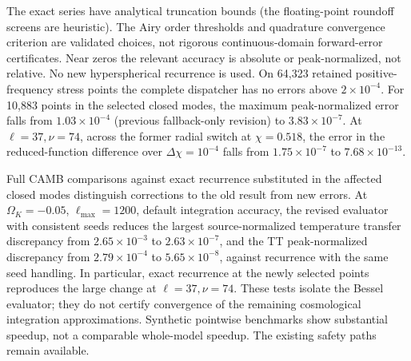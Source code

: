 \documentclass[10pt]{article}
\begin{document}
The exact series have analytical truncation bounds (the floating-point
roundoff screens are heuristic). The Airy order thresholds and quadrature
convergence criterion are validated choices, not rigorous continuous-domain
forward-error certificates. Near zeros the relevant accuracy is absolute or
peak-normalized, not relative. No new hyperspherical recurrence is used.
On 64,323 retained positive-frequency stress points the complete dispatcher
has no errors above $2\times10^{-4}$. For 10,883 points in the selected
closed modes, the maximum peak-normalized error falls from
$1.03\times10^{-4}$ (previous fallback-only revision) to $3.83\times10^{-7}$.
At $\ell=37,\nu=74$, across the former radial switch at $\chi=0.518$,
the error in the reduced-function difference over $\Delta\chi=10^{-4}$
falls from $1.75\times10^{-7}$ to $7.68\times10^{-13}$.

Full CAMB comparisons against exact recurrence substituted in the affected
closed modes distinguish corrections to the old result from new errors.
At $\Omega_K=-0.05$, $\ell_{\max}=1200$, default integration accuracy,
the revised evaluator with consistent seeds reduces the largest
source-normalized temperature transfer discrepancy from $2.65\times10^{-3}$
to $2.63\times10^{-7}$, and the TT peak-normalized discrepancy from
$2.79\times10^{-4}$ to $5.65\times10^{-8}$, against recurrence with the
same seed handling. In particular, exact recurrence at the newly selected
points reproduces the large change at $\ell=37,\nu=74$.
These tests isolate the Bessel evaluator; they do not certify convergence
of the remaining cosmological integration approximations.
Synthetic pointwise benchmarks show substantial speedup, not a comparable
whole-model speedup. The existing safety paths remain available.
\end{document}
